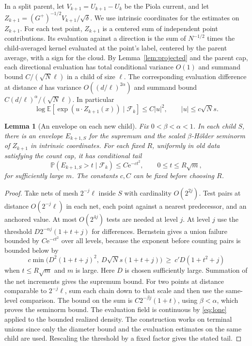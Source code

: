 \documentclass[11pt]{article}
\newtheorem{lemma}[theorem]{Lemma}
\newcommand{\E}{\mathbb E}
\newcommand{\PP}{\mathbb P}
\newcommand{\ee}{\mathrm e}
\begin{document}
In a split parent, let \(V_{k+1}=U_{k+1}-U_k\) be the Piola
current, and let \(Z_{k+1}=(G^+)^{-1/2}V_{k+1}/\sqrt\delta\).
We use intrinsic coordinates for the estimates on \(Z_{k+1}\).
For each test point, \(Z_{k+1}\) is a centered sum of independent
point contributions. Its evaluation against a direction is the
sum of \(N^{-1/2}\) times the child-averaged kernel evaluated at
the point's label, centered by the parent average, with a sign
for the cloud. By Lemma~\ref{lem:projected} and the parent cap,
each directional evaluation has total conditional variance \(O(1)\)
and summand bound \(C/(\sqrt N\ell)\) in a child of size \(\ell\).
The corresponding evaluation difference at distance \(d\) has
variance \(O((d/\ell)^{2\alpha})\) and summand bound
\(C(d/\ell)^\alpha/(\sqrt N\ell)\). In particular
\begin{equation}\label{eq:mgf}
 \log\E[\exp(u\cdot Z_{k+1}(x))\mid\mathcal F_k]\le C|u|^2,
 \qquad |u|\le c\sqrt N s .
\end{equation}

\begin{lemma}[An envelope on each new child]\label{lem:envelope}
Fix \(0<\beta<\alpha<1\). In each child \(S\), there is an envelope
\(E_{k+1,S}\) for the supremum and the scaled \(\beta\)-H\"older
seminorm of \(Z_{k+1}\) in intrinsic coordinates. For each fixed
\(R\), uniformly in old data satisfying the count cap, it has
conditional tail
\[
 \PP(E_{k+1,S}>t\mid\mathcal F_k)\le C\ee^{-ct^2},
 \qquad 0\le t\le R\sqrt m ,
\]
for sufficiently large \(m\). The constants \(c,C\) can be fixed
before choosing \(R\).
\end{lemma}
\begin{proof}
Take nets of mesh \(2^{-j}\ell\) inside \(S\) with cardinality
\(O(2^{2j})\). Test pairs at distance \(O(2^{-j}\ell)\)
in each net, each point against a nearest predecessor,
and an anchored value. At most \(O(2^{4j})\) tests are
needed at level \(j\).
At level \(j\) use the threshold
\(D 2^{-\alpha j}(1+t+j)\) for differences.
Bernstein gives a union failure bounded by \(C\ee^{-ct^2}\)
over all levels, because the exponent before counting pairs
is bounded below by
\[
 c\min\bigl(D^2(1+t+j)^2,\ D\sqrt N s(1+t+j)\bigr)
 \ \ge\ c'D(1+t^2+j)
\]
when \(t\le R\sqrt m\) and \(m\) is large.
Here \(D\) is chosen sufficiently large. Summation of the net
increments gives the supremum bound. For two points at distance
comparable to \(2^{-j}\ell\), sum each chain down to that scale
and then use the same-level comparison. The bound on the sum is
\(C2^{-\beta j}(1+t)\), using \(\beta<\alpha\), which proves
the seminorm bound. The evaluation field is continuous by \eqref{eq:lone}
applied to the bounded realized density.
The construction works on terminal unions since only the
diameter bound and the evaluation estimates on the same child
are used. Rescaling the threshold by a fixed factor gives
the stated tail.
\end{proof}
\end{document}
